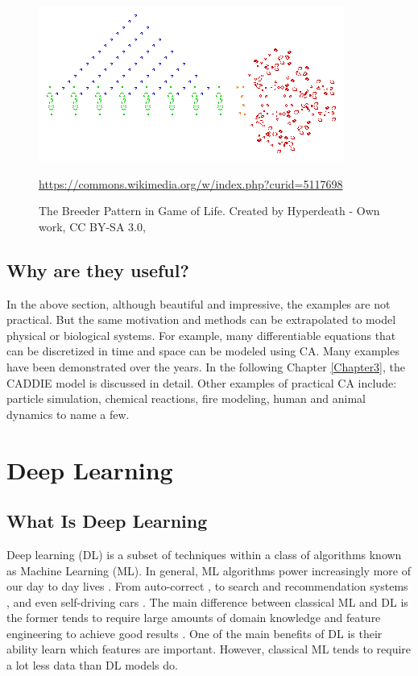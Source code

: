 \begin{figure}[tbph]
	\centering
	\includegraphics[width=0.8\linewidth, height=0.3\textheight]{Figures/Conways_game_of_life_breeder}
	\caption[Example Game Of Life Pattern (Breeder)]{The Breeder Pattern in Game of Life. Created by Hyperdeath - Own work, CC BY-SA 3.0, }
	\label{fig:breeder}
	\url{https://commons.wikimedia.org/w/index.php?curid=5117698}
\end{figure}


\subsection{Why are they useful?}
In the above section, although beautiful and impressive, the examples are not practical. But the same motivation and methods can be extrapolated to model physical or biological systems. For example, many differentiable equations that can be discretized in time and space can be modeled using CA. Many examples have been demonstrated over the years. In the following Chapter \ref{Chapter3}, the CADDIE model is discussed in detail. Other examples of practical CA include: particle simulation, chemical reactions, fire modeling, human and animal dynamics \cite{karafyllidis1997model, kier2005modeling, wolf2004lattice, alizadeh2011dynamic} to name a few.

\section{Deep Learning}
\subsection{What Is Deep Learning}
Deep learning (DL) is a subset of techniques within a class of algorithms known as Machine Learning (ML). In general, ML algorithms power increasingly more of our day to day lives \cite{lecun2015deep}. From auto-correct \cite{etoori2018automatic}, to search and recommendation systems \cite{haldar2019applying}, and even self-driving cars \cite{gupta2021deep}. The main difference between classical ML and DL is the former tends to require large amounts of domain knowledge and feature engineering to achieve good results \cite{dargan2020survey}. One of the main benefits of DL is their ability learn which features are important. However, classical ML tends to require a lot less data than DL models do. \\

